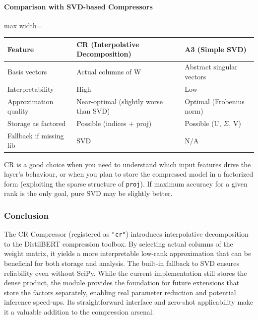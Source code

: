 \paragraph{Comparison with SVD-based Compressors}

\begin{center}
\begin{adjustbox}{max width=\columnwidth}
\renewcommand{\arraystretch}{1.2}
\begin{tabular}{lll}
\toprule
Feature & CR (Interpolative Decomposition) & A3 (Simple SVD) \\
\midrule
Basis vectors & Actual columns of W & Abstract singular vectors \\
Interpretability & High & Low \\
Approximation quality & Near-optimal (slightly worse than SVD) & Optimal (Frobenius norm) \\
Storage as factored & Possible (indices + proj) & Possible (U, $\Sigma$, V) \\
Fallback if missing lib & SVD & N/A \\

\bottomrule
\end{tabular}
\end{adjustbox}
\end{center}
CR is a good choice when you need to understand which input features drive the layer's behaviour, or when you plan to store the compressed model in a factorized form (exploiting the sparse structure of \texttt{proj}). If maximum accuracy for a given rank is the only goal, pure SVD may be slightly better.


\subsubsection*{Conclusion}

The CR Compressor (registered as \texttt{"cr"}) introduces interpolative decomposition to the DistilBERT compression toolbox. By selecting actual columns of the weight matrix, it yields a more interpretable low-rank approximation that can be beneficial for both storage and analysis. The built-in fallback to SVD ensures reliability even without SciPy. While the current implementation still stores the dense product, the module provides the foundation for future extensions that store the factors separately, enabling real parameter reduction and potential inference speed-ups. Its straightforward interface and zero-shot applicability make it a valuable addition to the compression arsenal.

